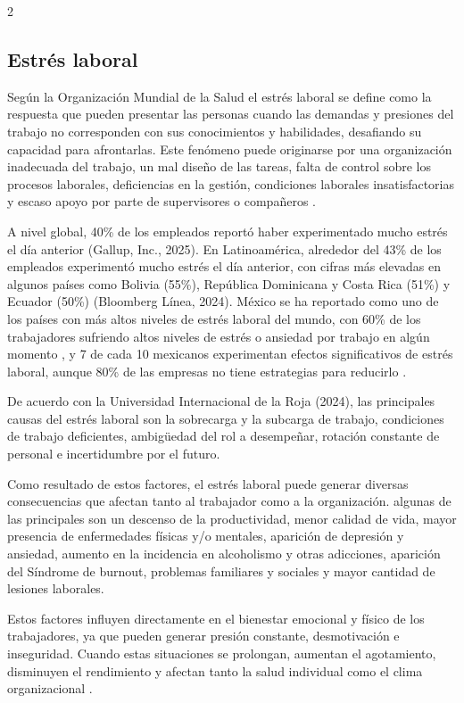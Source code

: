 \begin{multicols}{2}
\subsection{Estrés laboral}

Según la Organización Mundial de la Salud el estrés laboral se define como la respuesta que pueden presentar las personas cuando las demandas y presiones del trabajo no corresponden con sus conocimientos y habilidades, desafiando su capacidad para afrontarlas. Este fenómeno puede originarse por una organización inadecuada del trabajo, un mal diseño de las tareas, falta de control sobre los procesos laborales, deficiencias en la gestión, condiciones laborales insatisfactorias y escaso apoyo por parte de supervisores o compañeros \citep{maulik2017}.

A nivel global, 40\% de los empleados reportó haber experimentado mucho estrés el día anterior (Gallup, Inc., 2025). En Latinoamérica, alrededor del 43\% de los empleados experimentó mucho estrés el día anterior, con cifras más elevadas en algunos países como Bolivia (55\%), República Dominicana y Costa Rica (51\%) y Ecuador (50\%) (Bloomberg Línea, 2024). México se ha reportado como uno de los países con más altos niveles de estrés laboral del mundo, con 60\% de los trabajadores sufriendo altos niveles de estrés o ansiedad por trabajo en algún momento \citep{atalayar2022}, y 7 de cada 10 mexicanos experimentan efectos significativos de estrés laboral, aunque 80\% de las empresas no tiene estrategias para reducirlo \citep{corresponsables2023}.

De acuerdo con la Universidad Internacional de la Roja (2024), las principales causas del estrés laboral son la sobrecarga y la subcarga de trabajo, condiciones de trabajo deficientes, ambigüedad del rol a desempeñar, rotación constante de personal e incertidumbre por el futuro.

Como resultado de estos factores, el estrés laboral puede generar diversas consecuencias que afectan tanto al trabajador como a la organización. algunas de las principales son un descenso de la productividad, menor calidad de vida, mayor presencia de enfermedades físicas y/o mentales, aparición de depresión y ansiedad, aumento en la incidencia en alcoholismo y otras adicciones, aparición del Síndrome de burnout, problemas familiares y sociales y mayor cantidad de lesiones laborales.

Estos factores influyen directamente en el bienestar emocional y físico de los trabajadores, ya que pueden generar presión constante, desmotivación e inseguridad. Cuando estas situaciones se prolongan, aumentan el agotamiento, disminuyen el rendimiento y afectan tanto la salud individual como el clima organizacional \citep{unir2024}.


\end{multicols}
